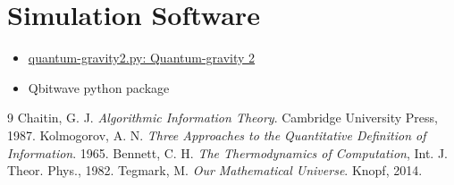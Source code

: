 \documentclass[11pt]{article}
\begin{document}
\section*{Simulation Software}

\begin{itemize}
\item \href{simulations/quantum-gravity2.py}{quantum-gravity2.py: Quantum-gravity 2}
\item Qbitwave python package
\end{itemize}



\begin{thebibliography}{9}
 Chaitin, G. J. \textit{Algorithmic Information Theory}. Cambridge University Press, 1987.
 Kolmogorov, A. N. \textit{Three Approaches to the Quantitative Definition of Information}. 1965.
 Bennett, C. H. \textit{The Thermodynamics of Computation}, Int. J. Theor. Phys., 1982.
 Tegmark, M. \textit{Our Mathematical Universe}. Knopf, 2014.
\end{thebibliography}

\printbibliography
\end{document}

